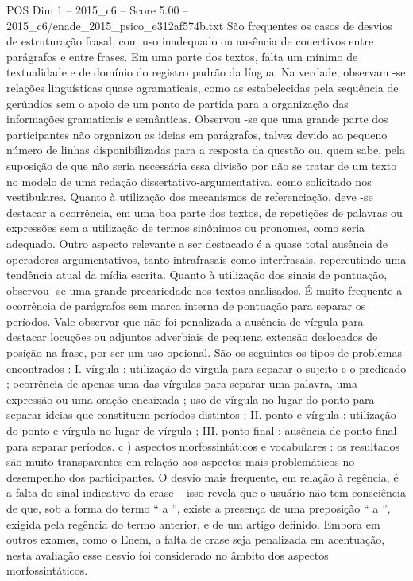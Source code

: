 \begin{textsample}{POS Dim 1 – 2015\_c6 – Score 5.00 – 2015\_c6/enade\_2015\_psico\_e312af574b.txt}
São frequentes os casos de desvios de estruturação frasal, com uso inadequado ou ausência de conectivos entre parágrafos e entre frases.
Em uma parte dos textos, falta um mínimo de textualidade e de domínio do registro padrão da língua.
Na verdade, observam -se relações linguísticas quase agramaticais, como as estabelecidas pela sequência de gerúndios sem o apoio de um ponto de partida para a organização das informações gramaticais e semânticas.
Observou -se que uma grande parte dos participantes não organizou as ideias em parágrafos, talvez devido ao pequeno número de linhas disponibilizadas para a resposta da questão ou, quem sabe, pela suposição de que não seria necessária essa divisão por não se tratar de um texto no modelo de uma redação dissertativo-argumentativa, como solicitado nos vestibulares.
Quanto à utilização dos mecanismos de referenciação, deve -se destacar a ocorrência, em uma boa parte dos textos, de repetições de palavras ou expressões sem a utilização de termos sinônimos ou pronomes, como seria adequado.
Outro aspecto relevante a ser destacado é a quase total ausência de operadores argumentativos, tanto intrafrasais como interfrasais, repercutindo uma tendência atual da mídia escrita.
Quanto à utilização dos sinais de pontuação, observou -se uma grande precariedade nos textos analisados.
É muito frequente a ocorrência de parágrafos sem marca interna de pontuação para separar os períodos.
Vale observar que não foi penalizada a ausência de vírgula para destacar locuções ou adjuntos adverbiais de pequena extensão deslocados de posição na frase, por ser um uso opcional.
São os seguintes os tipos de problemas encontrados : I. vírgula : utilização de vírgula para separar o sujeito e o predicado ; ocorrência de apenas uma das vírgulas para separar uma palavra, uma expressão ou uma oração encaixada ; uso de vírgula no lugar do ponto para separar ideias que constituem períodos distintos ; II. ponto e vírgula : utilização do ponto e vírgula no lugar de vírgula ; III. ponto final : ausência de ponto final para separar períodos. c ) aspectos morfossintáticos e vocabulares : os resultados são muito transparentes em relação aos aspectos mais problemáticos no desempenho dos participantes.
O desvio mais frequente, em relação à regência, é a falta do sinal indicativo da crase – isso revela que o usuário não tem consciência de que, sob a forma do termo “ a ”, existe a presença de uma preposição “ a ”, exigida pela regência do termo anterior, e de um artigo definido.
Embora em outros exames, como o Enem, a falta de crase seja penalizada em acentuação, nesta avaliação esse desvio foi considerado no âmbito dos aspectos morfossintáticos.

\end{textsample}
